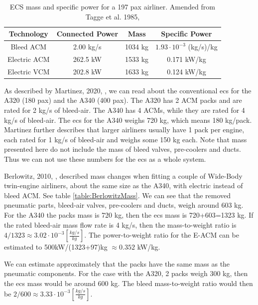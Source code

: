\documentclass[english]{kththesis}
\begin{document}
\begin{table}[h!]
\centering
\caption{ECS mass and specific power for a 197 pax airliner. Amended from Tagge et al. 1985, \cite{Tagge1985}}
\begin{tabular}{| c | c | c | c |} 
\hline
Technology & Connected Power & Mass & Specific Power \\
\hline
Bleed ACM & 2.00 kg/s & 1034 kg & $1.93 \cdot 10 ^{-3}$ (kg/s)/kg \\
Electric ACM & 262.5 kW & 1533 kg & 0.171 kW/kg \\
Electric VCM & 202.8 kW & 1633 kg & 0.124 kW/kg \\
\hline
\end{tabular}
\label{table:TaggeMass}
\end{table}

As described by Martinez, 2020, \cite{Martinez2020}, we can read about the conventional \acrshort{ecs} for the A320 (180 pax) and the A340 (400 pax). The A320 has 2 ACM packs and are rated for 2 kg/s of bleed-air. The A340 has 4 ACMs, while they are rated for 4 kg/s of bleed-air. The \acrshort{ecs} for the A340 weighs 720 kg, which means 180 kg/pack. Martinez further describes that larger airliners usually have 1 pack per engine, each rated for 1 kg/s of bleed-air and weighs some 150 kg each. Note that mass presented here do not include the mass of bleed valves, pre-coolers and ducts. Thus we can not use these numbers for the \acrshort{ecs} as a whole system.

Berlowitz, 2010, \cite{Berlowitz2010}, described mass changes when fitting a couple of Wide-Body twin-engine airliners, about the same size as the A340, with electric instead of bleed ACM. See table \ref{table:BerlowitzMass}. We can see that the removed pneumatic parts, bleed-air valves, pre-coolers and ducts, weigh around 603 kg. For the A340 the packs mass is 720 kg, then the \acrshort{ecs} mass is 720+603=1323 kg. If the rated bleed-air mass flow rate is 4 kg/s, then the mass-to-weight ratio is $4/1323 \approx 3.02 \cdot 10^{-3} \left[\frac{kg/s}{kg}\right]$. The power-to-weight ratio for the E-ACM can be estimated to 500kW/(1323+97)kg $\approx 0.352$ kW/kg.

We can estimate approximately that the packs have the same mass as the pneumatic components. For the case with the A320, 2 packs weigh 300 kg, then the \acrshort{ecs} mass would be around 600 kg. The bleed mass-to-weight ratio would then be $2/600 \approx 3.33 \cdot 10^{-3} \left[\frac{kg/s}{kg}\right]$.
\end{document}
